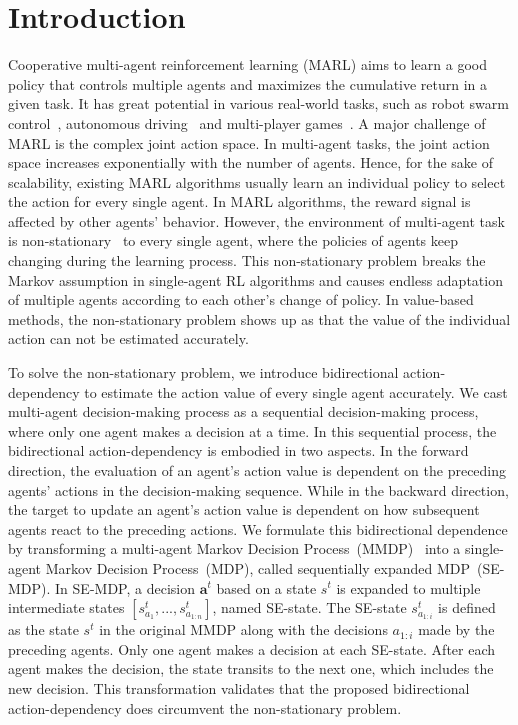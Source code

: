 \documentclass[letterpaper]{article} \usepackage{aaai23}  \usepackage{times}  \usepackage{helvet}  \usepackage{courier}  \usepackage[hyphens]{url}  \usepackage{graphicx} \urlstyle{rm} \def\UrlFont{\rm}  \usepackage{natbib}  \usepackage{caption} \frenchspacing  \setlength{\pdfpagewidth}{8.5in} \setlength{\pdfpageheight}{11in} \usepackage{algorithm}
\begin{document}
 \section{Introduction}
\vspace{-0.5ex}
Cooperative multi-agent reinforcement learning (MARL) aims to learn a good policy that controls multiple agents and maximizes the cumulative return in a given task. It has great potential in various real-world tasks, such as robot swarm control~\citeyear{swarm}, autonomous driving~\citeyear{smarts,safe_ad} and multi-player games~\citeyear{mobo,pettingzoo}. A major challenge of MARL is the complex joint action space. In multi-agent tasks, the joint action space increases exponentially with the number of agents. Hence, for the sake of scalability, existing MARL algorithms usually learn an individual policy to select the action for every single agent. In MARL algorithms, the reward signal is affected by other agents' behavior. However, the environment of multi-agent task is non-stationary~\citeyear{non_stationarity,multireview} to every single agent, where the policies of agents keep changing during the learning process. This non-stationary problem breaks the Markov assumption in single-agent RL algorithms and causes endless adaptation of multiple agents according to each other's change of policy.
In value-based methods, the non-stationary problem shows up as that the value of the individual action can not be estimated accurately.

To solve the non-stationary problem, we introduce bidirectional action-dependency to estimate the action value of every single agent accurately. 
We cast multi-agent decision-making process as a sequential decision-making process, where only one agent makes a decision at a time.
In this sequential process, the bidirectional action-dependency is embodied in two aspects. 
In the forward direction, the evaluation of an agent's action value is dependent on the preceding agents' actions in the decision-making sequence.
While in the backward direction, the target to update an agent's action value is dependent on how subsequent agents react to the preceding actions. 
We formulate this bidirectional dependence by transforming a multi-agent Markov Decision Process~(MMDP)~\citeyear{markov} into a single-agent Markov Decision Process~(MDP), called sequentially expanded MDP~(SE-MDP). In SE-MDP, a decision $\boldsymbol{a}^t$ based on a state $s^t$ is expanded to multiple intermediate states $\left[s^t_{a_1},...,s^t_{a_{1:n}}\right]$, named SE-state. The SE-state $s^t_{a_{1:i}}$ is defined as the state $s^t$ in the original MMDP along with the decisions $a_{1:i}$ made by the preceding agents. Only one agent makes a decision at each SE-state. After each agent makes the decision, the state transits to the next one, which includes the new decision. This transformation validates that the proposed bidirectional action-dependency does circumvent the non-stationary problem.
\end{document}
